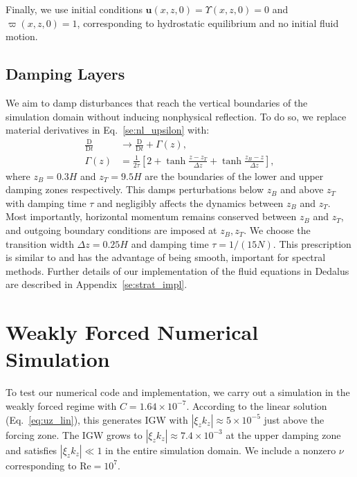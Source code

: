\documentclass[
        fleqn,
        usenatbib,
    ]{mnras}
\newcommand*{\scinot}[2]{#1\times10^{#2}}
\newcommand*{\md}[2]{\frac{\mathrm{D}#1}{\mathrm{D}#2}}
\newcommand*{\abs}[1]{\left|#1\right|}
\newcommand*{\s}[1]{\left[#1\right]}
\newcommand*{\bm}[1]{\mathbf{#1}}
\begin{document}
Finally, we use initial conditions $\bm{u}(x, z, 0) = \Upsilon(x, z, 0) = 0$ and
$\varpi(x, z, 0) = 1$, corresponding to hydrostatic equilibrium and no initial
fluid motion.

\subsection{Damping Layers}\label{ss:damping}

We aim to damp disturbances that reach the vertical boundaries of the simulation
domain without inducing nonphysical reflection. To do so, we replace material
derivatives in Eq.~\eqref{se:nl_upsilon} with:
\begin{align}
    \md{}{t} &\to \md{}{t} + \Gamma(z),\\
    \Gamma(z) &= \frac{1}{2\tau}\s{2 + \tanh \frac{z - z_T}{\Delta z}
        + \tanh \frac{z_B - z}{\Delta z}},\label{eq:Gamma}
\end{align}
where $z_B = 0.3H$ and $z_T = 9.5H$ are the boundaries of the lower and upper
damping zones respectively. This damps perturbations below $z_B$ and
above $z_T$ with damping time $\tau$ and negligibly affects the dynamics between
$z_B$ and $z_T$. Most importantly, horizontal momentum remains
conserved between $z_B$ and $z_T$, and outgoing boundary conditions are imposed
at $z_B, z_T$. We choose the transition width $\Delta z = 0.25H$ and damping
time $\tau = 1 / (15N)$. This prescription is similar to \citet{lecoanet_damp}
and has the advantage of being smooth, important for spectral methods. Further
details of our implementation of the fluid equations in Dedalus are described in
Appendix~\ref{se:strat_impl}.

\section{Weakly Forced Numerical Simulation}\label{s:weak_sim}

To test our numerical code and implementation, we carry out a simulation in the
weakly forced regime with $C = \scinot{1.64}{-7}$. According to the linear
solution (Eq.~\eqref{eq:uz_lin}), this generates IGW with $\abs{\xi_z k_z}
\approx \scinot{5}{-5}$ just above the forcing zone. The IGW grows to $\abs{\xi_z
k_z} \approx \scinot{7.4}{-3}$ at the upper damping zone and satisfies
$\abs{\xi_z k_z} \ll 1$ in the entire simulation domain. We include a nonzero
$\nu$ corresponding to $\mathrm{Re} = 10^7$.
\end{document}
